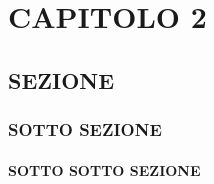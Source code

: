 \chapter{CAPITOLO 2} \label{Cap.2}
\vspace{2cm}

\begin{flushright}
    \textit{\lipsum[1][1-5]}
\end{flushright}

\vspace{0.5cm}



\lipsum[1-5]


\section{SEZIONE}
\lipsum[6]

\subsection{SOTTO SEZIONE}
\lipsum[7]

\subsubsection{SOTTO SOTTO SEZIONE}
\lipsum[8]
